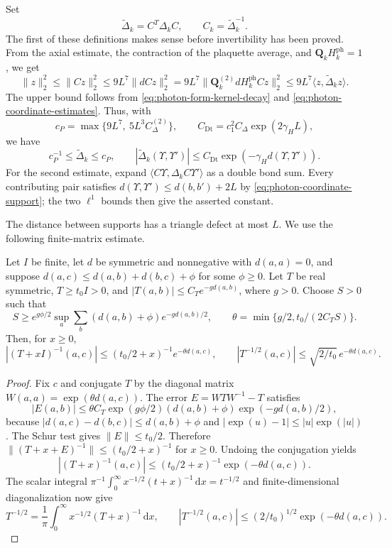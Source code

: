 \documentclass[11pt,letterpaper,reqno]{amsart}
\newcommand{\dd}{\mathrm d}
\begin{document}
Set
\[
 \widetilde\Delta_k=C^T\Delta_k C,
 \qquad C_k=\widetilde\Delta_k^{-1}.
\]
The first of these definitions makes sense before invertibility
has been proved. From the axial estimate, the contraction of the
plaquette average, and $\mathbf Q_kH_k^{\mathrm{ph}}=1$, we get
\[
 \|z\|_2^2\le\|Cz\|_2^2
 \le9L^7\|dCz\|_2^2
 =9L^7\|\mathbf Q_k^{(2)}dH_k^{\mathrm{ph}}Cz\|_2^2
 \le9L^7\langle z,\widetilde\Delta_kz\rangle.
\]
The upper bound follows from
\eqref{eq:photon-form-kernel-decay} and
\eqref{eq:photon-coordinate-estimates}. Thus, with
\[
 c_P=\max\{9L^7,\ 5L^3 C_\Delta^{(2)}\},
 \qquad
 C_{\mathrm{Dt}}=c_1^2C_\Delta\exp(2\gamma_HL),
\]
we have
\begin{equation}\label{eq:photon-fluctuation-form-estimates}
 c_P^{-1}\le\widetilde\Delta_k\le c_P,
 \qquad
 |\widetilde\Delta_k(\Upsilon,\Upsilon')|
       \le C_{\mathrm{Dt}}\exp(-\gamma_Hd(\Upsilon,\Upsilon')).
\end{equation}
For the second estimate, expand
$\langle C\Upsilon,\Delta_kC\Upsilon'\rangle$ as a double bond
sum. Every contributing pair satisfies
$d(\Upsilon,\Upsilon')\le d(b,b')+2L$ by
\eqref{eq:photon-coordinate-support}; the two $\ell^1$ bounds
then give the asserted constant.

The distance between supports has a triangle defect at most $L$.
We use the following finite-matrix estimate.

\begin{lemma}\label{lem:positive-root-locality}
Let $I$ be finite, let $d$ be symmetric and nonnegative with
$d(a,a)=0$, and suppose
$d(a,c)\le d(a,b)+d(b,c)+\phi$ for some $\phi\ge0$.
Let $T$ be real symmetric, $T\ge t_0I>0$, and
$|T(a,b)|\le C_Te^{-gd(a,b)}$, where $g>0$.
Choose $S>0$ such that
\[
 S\ge e^{g\phi/2}\sup_a\sum_b(d(a,b)+\phi)e^{-gd(a,b)/2},
 \qquad
 \theta=\min\{g/2,t_0/(2C_TS)\}.
\]
Then, for $x\ge0$,
\[
 |(T+xI)^{-1}(a,c)|\le(t_0/2+x)^{-1}e^{-\theta d(a,c)},
 \qquad
 |T^{-1/2}(a,c)|\le\sqrt{2/t_0}\,e^{-\theta d(a,c)}.
\]
\end{lemma}
\begin{proof}
Fix $c$ and conjugate $T$ by the diagonal matrix
$W(a,a)=\exp(\theta d(a,c))$. The error $E=WTW^{-1}-T$ satisfies
\[
 |E(a,b)|\le\theta C_T\exp(g\phi/2)(d(a,b)+\phi)
                                      \exp(-g d(a,b)/2),
\]
because $|d(a,c)-d(b,c)|\le d(a,b)+\phi$ and
$|\exp(u)-1|\le|u|\exp(|u|)$. The Schur test gives
$\|E\|\le t_0/2$. Therefore
$\|(T+x+E)^{-1}\|\le(t_0/2+x)^{-1}$ for $x\ge0$.
Undoing the conjugation yields
\[
 |(T+x)^{-1}(a,c)|\le(t_0/2+x)^{-1}\exp(-\theta d(a,c)).
\]
The scalar integral
$\pi^{-1}\int_0^\infty x^{-1/2}(t+x)^{-1}\,\dd x=t^{-1/2}$
and finite-dimensional diagonalization now give
\begin{equation}\label{eq:photon-root-integral}
 T^{-1/2}=\frac1\pi\int_0^\infty x^{-1/2}(T+x)^{-1}\,\dd x,
 \qquad
 |T^{-1/2}(a,c)|\le(2/t_0)^{1/2}\exp(-\theta d(a,c)).
\end{equation}

\end{proof}
\end{document}
